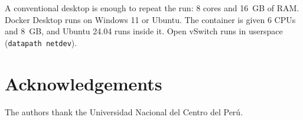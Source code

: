 \documentclass[a4paper,fleqn]{cas-dc}
\begin{document}
A conventional desktop is enough to repeat the run: 8 cores and
16~GB of RAM. Docker Desktop runs on Windows 11 or Ubuntu. The
container is given 6 CPUs and 8~GB, and Ubuntu 24.04 runs inside it.
Open vSwitch runs in userspace (\texttt{datapath netdev}).

\section*{Acknowledgements}
The authors thank the Universidad Nacional del Centro del Per\'u.



\end{document}
